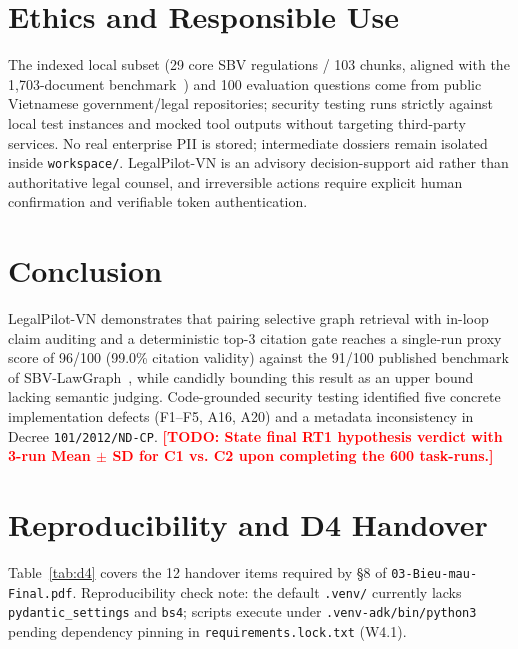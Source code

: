 \documentclass[sigconf,nonacm]{acmart}
\newcommand{\TODO}[1]{\textcolor{red}{\textbf{[TODO: #1]}}}
\begin{document}
\section{Ethics and Responsible Use}
\label{sec:ethics}

The indexed local subset (29 core SBV regulations / 103 chunks, aligned with the 1,703-document benchmark~\cite{phan2026sbv}) and 100 evaluation questions come from public Vietnamese government/legal repositories; security testing runs strictly against local test instances and mocked tool outputs without targeting third-party services. No real enterprise PII is stored; intermediate dossiers remain isolated inside \texttt{workspace/}. LegalPilot-VN is an advisory decision-support aid rather than authoritative legal counsel, and irreversible actions require explicit human confirmation and verifiable token authentication.

\section{Conclusion}
\label{sec:concl}

LegalPilot-VN demonstrates that pairing selective graph retrieval with in-loop claim auditing and a deterministic top-3 citation gate reaches a single-run proxy score of 96/100 (99.0\% citation validity) against the 91/100 published benchmark of SBV-LawGraph~\cite{phan2026sbv}, while candidly bounding this result as an upper bound lacking semantic judging. Code-grounded security testing identified five concrete implementation defects (F1--F5, A16, A20) and a metadata inconsistency in Decree \texttt{101/2012/ND-CP}. \TODO{State final RT1 hypothesis verdict with 3-run Mean $\pm$ SD for C1 vs. C2 upon completing the 600 task-runs.}

\balance



\appendix

\section{Reproducibility and D4 Handover}
\label{app:repro}

Table~\ref{tab:d4} covers the 12 handover items required by §8 of \texttt{03-Bieu-mau-Final.pdf}. Reproducibility check note: the default \texttt{.venv/} currently lacks \texttt{pydantic\_settings} and \texttt{bs4}; scripts execute under \texttt{.venv-adk/bin/python3} pending dependency pinning in \texttt{requirements.lock.txt} (W4.1).
\end{document}
